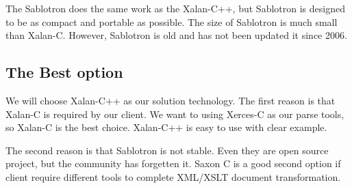 The Sablotron does the same work as the Xalan-C++, but Sablotron is designed to be as compact and portable as possible.
The size of Sablotron is much small than Xalan-C.
However, Sablotron is old and has not been updated it since 2006.

\subsection{The Best option}

We will choose Xalan-C++ as our solution technology.
The first reason is that Xalan-C is required by our client.
We want to using Xerces-C as our parse tools, so Xalan-C is the best choice.
Xalan-C++ is easy to use with clear example.

The second reason is that Sablotron is not stable.
Even they are open source project, but the community has forgetten it.
Saxon C is a good second option if client require different tools to complete XML/XSLT document transformation.
